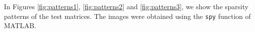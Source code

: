 In Figures \ref{fig:patterns1}, \ref{fig:patterns2} and \ref{fig:patterns3}, we show the sparsity patterns of the test matrices. The images were obtained using the \verb|spy| function of MATLAB.

\begin{figure}[h]
	\centering
	

\end{figure}
